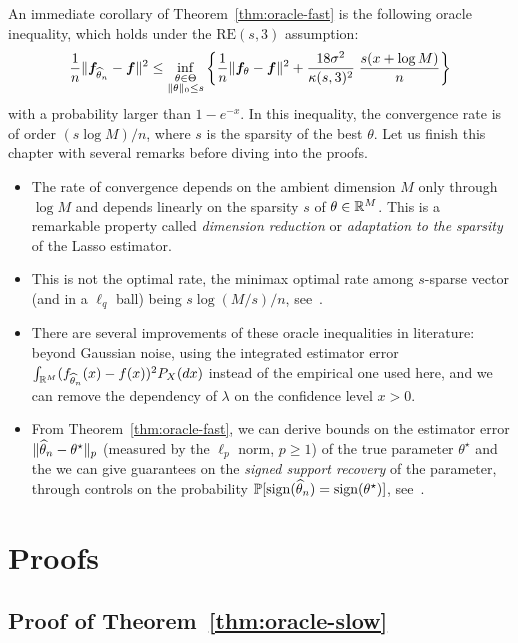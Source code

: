 An immediate corollary of Theorem~\ref{thm:oracle-fast} is the following oracle inequality, which holds under the $\text{RE}(s, 3)$ assumption:
\begin{equation*}
	\frac 1n \| {\boldsymbol f}_{\widehat \theta_n} - {\boldsymbol f} \|^2 \leq 
	\inf_{\substack{\theta \in \Theta \\ \| \theta \|_0 \leq s}}
	\bigg\{ \frac 1n  \| {\boldsymbol f}_{\theta} - {\boldsymbol f} \|^2  + \frac{18 \sigma^2}{\kappa(s, 3)^2} 
	\; \frac{s(x + \log M)}{n} \bigg\}
\end{equation*}
with a probability larger than $1 - e^{-x}$.
In this inequality, the convergence rate is of order $(s \log M) / n$, where $s$ is the sparsity of the best $\theta$.
Let us finish this chapter with several remarks before diving into the proofs.
\begin{itemize}
	\item The rate of convergence depends on the ambient dimension $M$ only through $\log M$ and depends linearly on the sparsity $s$ of $\theta \in \mathbb R^M$. This is a remarkable property called \emph{dimension reduction} or \emph{adaptation to the sparsity} of the Lasso estimator.
	\item This is not the optimal rate, the minimax optimal rate among $s$-sparse vector (and in a $\ell_q$ ball) being $s \log(M / s) / n$, see~.
	\item There are several improvements of these oracle inequalities in literature: beyond Gaussian noise, using the integrated estimator error $\int_{\mathbb R^M} (f_{\widehat \theta_n}(x) - f(x))^2 P_X(dx)$ instead of the empirical one used here, and we can remove the dependency of $\lambda$ on the confidence level $x > 0$.
	\item From Theorem~\ref{thm:oracle-fast}, we can derive bounds on the estimator error $\| \widehat \theta_n - \theta^\star \|_p$ (measured by the $\ell_p$ norm, $p \geq 1$) of the true parameter $\theta^\star$ and the we can give guarantees on the \emph{signed support recovery} of the parameter, through controls on the probability 
	$\mathbb P[ \operatorname{sign}(\widehat \theta_n) = \operatorname{sign}(\theta^\star)]$, see~.
\end{itemize}

\section{Proofs} %
\label{sec:lasso-proofs}


\subsection{Proof of Theorem~\ref{thm:oracle-slow}} %
\label{sub:proof_of_theorem_thm:oracle-slow}

